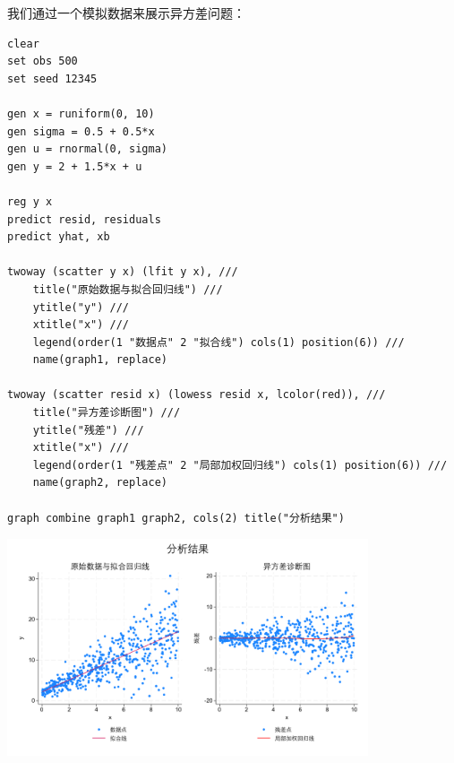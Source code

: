 我们通过一个模拟数据来展示异方差问题：

\begin{tcolorbox}[title=在 Stata 中展示异方差问题, colback=white, colframe=black, colbacktitle=white, coltitle=black,fonttitle=\bfseries]
	\begin{lstlisting}[xleftmargin=2em,
		basicstyle=\ttfamily\small\color{black},
		keywordstyle=\color{black},
		commentstyle=\color{black},
		stringstyle=\color{black},
		identifierstyle=\color{black},
		numberstyle=\color{black},
		showstringspaces=false,
		morekeywords={clear, set, seed, net, install, mc_ols_sim, from, replace, use, collapse, list, twoway, histogram, kdensity, line, title, legend, yline, xline, aspectratio, plotregion, graphregion, save, color}]
clear
set obs 500
set seed 12345

gen x = runiform(0, 10)
gen sigma = 0.5 + 0.5*x
gen u = rnormal(0, sigma)
gen y = 2 + 1.5*x + u

reg y x
predict resid, residuals
predict yhat, xb

twoway (scatter y x) (lfit y x), ///
    title("原始数据与拟合回归线") ///
    ytitle("y") ///
    xtitle("x") ///
    legend(order(1 "数据点" 2 "拟合线") cols(1) position(6)) ///
    name(graph1, replace)

twoway (scatter resid x) (lowess resid x, lcolor(red)), ///
    title("异方差诊断图") ///
    ytitle("残差") ///
    xtitle("x") ///
    legend(order(1 "残差点" 2 "局部加权回归线") cols(1) position(6)) ///
    name(graph2, replace)

graph combine graph1 graph2, cols(2) title("分析结果")
	\end{lstlisting}
	\vspace{2em}
	\begin{center}
	\includegraphics[width=0.8\textwidth]{image/heteroskedasticity.pdf}
	\end{center}
\end{tcolorbox}

